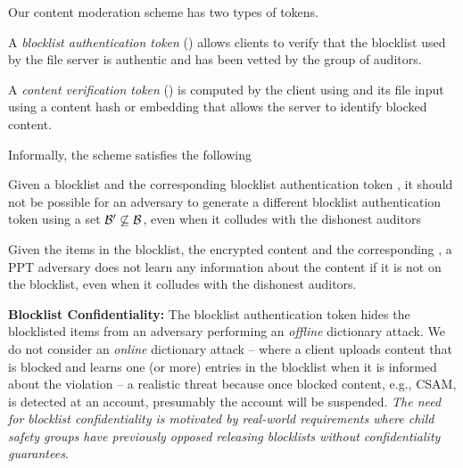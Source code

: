 \iffalse 
Our content moderation scheme has two types of tokens. 

\enumListStart
\item A \emph{blocklist authentication token} (\blklistToken{\blocklist}) allows clients to verify that the blocklist \blocklist used by the file server is authentic and has been vetted by the group of auditors. 
\item A \emph{content verification token} (\contentToken{\clientData}) is computed by the client using \blklistToken{\blocklist} and its file input \clientData using a content hash or embedding that allows the server to identify blocked content.
\enumListEnd



Informally, the scheme satisfies the following 

\enumListStart
	
	\item {} Given a blocklist \blocklist and the corresponding blocklist authentication token \blklistToken{\blocklist}, it should not be possible for an adversary to generate a different blocklist authentication token  using a set $\blocklist' \not \subseteq \blocklist$, even when it colludes with the dishonest auditors



	\item {}
	Given the items in the blocklist, the encrypted content and the corresponding \contentToken{\clientData}, a 
	PPT adversary does not learn any information about the content if it is not on the blocklist, even when it 
	colludes with the dishonest auditors. 
	

	\item \textbf{Blocklist Confidentiality:} The blocklist authentication token \blklistToken{\blocklist} hides the 
	blocklisted items from an adversary performing an \emph{offline} dictionary attack.  We do not consider an \emph{online} dictionary attack -- where a client uploads content that is blocked and learns one (or more) entries in the blocklist when it is informed about the violation -- a realistic threat because once blocked content, e.g., CSAM, is detected at an account, presumably the account will be suspended. \emph{The need for blocklist confidentiality is motivated by real-world requirements where child safety groups have previously opposed releasing blocklists without confidentiality guarantees}. 
	
